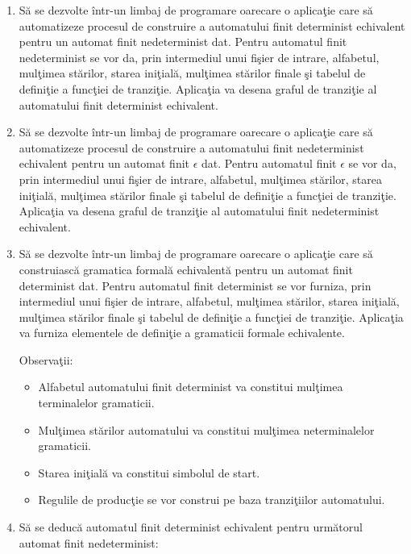 \begin{enumerate}
\item
Să se dezvolte într-un limbaj de programare oarecare o aplicaţie care să automatizeze procesul de construire a automatului finit determinist echivalent pentru un automat finit nedeterminist dat. Pentru automatul finit nedeterminist se vor da, prin intermediul unui fişier de intrare, alfabetul, mulţimea stărilor, starea iniţială, mulţimea stărilor finale şi tabelul de definiţie a funcţiei de tranziţie. Aplicaţia va desena graful de tranziţie al automatului finit determinist echivalent.

\item
Să se dezvolte într-un limbaj de programare oarecare o aplicaţie care să automatizeze procesul de construire a automatului finit nedeterminist echivalent pentru un automat finit $\epsilon$ dat. Pentru automatul finit $\epsilon$ se vor da, prin intermediul unui fişier de intrare, alfabetul, mulţimea stărilor, starea iniţială, mulţimea stărilor finale şi tabelul de definiţie a funcţiei de tranziţie. Aplicaţia va desena graful de tranziţie al automatului finit nedeterminist echivalent.

\item
Să se dezvolte într-un limbaj de programare oarecare o aplicaţie care să construiască gramatica formală echivalentă pentru un automat finit determinist dat. Pentru automatul finit determinist se vor furniza, prin intermediul unui fişier de intrare, alfabetul, mulţimea stărilor, starea iniţială, mulţimea stărilor finale şi tabelul de definiţie a funcţiei de tranziţie. Aplicaţia va furniza elementele de definiţie a gramaticii formale echivalente.

Observaţii: 

\begin{itemize}
\item Alfabetul automatului finit determinist va constitui mulţimea terminalelor gramaticii.
\item Mulţimea stărilor automatului va constitui mulţimea neterminalelor gramaticii.
\item Starea iniţială va constitui simbolul de start.
\item Regulile de producţie se vor construi pe baza tranziţiilor automatului.
\end{itemize}

\item
Să se deducă automatul finit determinist echivalent pentru următorul automat finit nedeterminist:


\end{enumerate}
